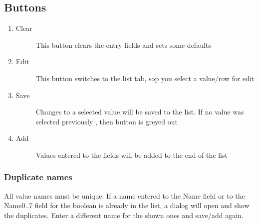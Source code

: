 \documentclass[a4paper,10pt,english]{sphinxmanual}
\begin{document}
\subsection{Buttons}
\label{\detokenize{values:buttons}}\begin{enumerate}
%
\item {} \begin{description}
\item[{Clear}] \leavevmode
This button clears the entry fields and sets some defaults

\end{description}

\item {} \begin{description}
\item[{Edit}] \leavevmode
This button switches to the list tab, sop you select a value/row for edit

\end{description}

\item {} \begin{description}
\item[{Save}] \leavevmode
Changes to a selected value will be saved to the list.
If no value was selected previously , then button is greyed out

\end{description}

\item {} \begin{description}
\item[{Add}] \leavevmode
Values entered to the fields will be added to the end of the list

\end{description}

\end{enumerate}


\subsubsection{Duplicate names}
\label{\detokenize{values:duplicate-names}}
All value names must be unique. If a name entered to the Name field
or to the Name0..7 field for the boolean is already in the list, a
dialog will open and show the duplicates. Enter a different name for the shown ones
and save/add again.

\end{document}
